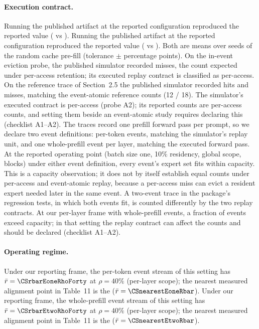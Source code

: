 \paragraph{Execution contract.}
Running the published artifact at the reported configuration reproduced the
reported value (\CSreproInfinity{} vs \CSreportedInfinity{}). Running the
published artifact at the reported configuration reproduced the reported value
(\CSreproBeyond{} vs \CSreportedBeyond{}). Both are means over \CSseeds{} seeds
of the random cache pre-fill (tolerance $\pm$\CSreproTolerance{} percentage
points). On the in-event eviction probe, the published simulator recorded
\CSprobeAtwoMisses{} misses, the count expected under per-access retention; its
executed replay contract is classified as per-access. On the reference trace of
Section~2.5 the published simulator recorded \CSprobeAoneHits{} hits and
\CSprobeAoneMisses{} misses, matching the event-atomic reference counts
(12 / 18). The simulator's executed contract is per-access (probe A2); its
reported counts are per-access counts, and setting them beside an event-atomic
study requires declaring this (checklist A1--A2). The traces record one prefill
forward pass per prompt, so we declare two event definitions: per-token events,
matching the simulator's replay unit, and one whole-prefill event per layer,
matching the executed forward pass. At the reported operating point (batch size
one, 10\% residency, global scope, \CStheirCapacity{} blocks) under either event
definition, every event's expert set fits within capacity. This is a capacity
observation; it does not by itself establish equal counts under per-access and
event-atomic replay, because a per-access miss can evict a resident expert
needed later in the same event. A two-event trace in the package's regression
tests, in which both events fit, is counted differently by the two replay
contracts. At our per-layer frame with whole-prefill events, a fraction
\CSoverCapEtwoPerLayerTen{} of events exceed capacity; in that setting the
replay contract can affect the counts and should be declared (checklist A1--A2).

\paragraph{Operating regime.}
Under our reporting frame, the per-token event stream of this setting has
$\bar r = \CSrbarEoneRhoForty$ at $\rho = 40\%$ (per-layer scope); the nearest
measured alignment point in Table~11 is the \CSnearestEone{}
($\bar r = \CSnearestEoneRbar$). Under our reporting frame, the whole-prefill
event stream of this setting has $\bar r = \CSrbarEtwoRhoForty$ at $\rho = 40\%$
(per-layer scope); the nearest measured alignment point in Table~11 is the
\CSnearestEtwo{} ($\bar r = \CSnearestEtwoRbar$).


